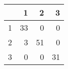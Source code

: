 \begin{tabular}{rrrr}
  \hline
 & 1 & 2 & 3 \\ 
  \hline
1 &  33 &   0 &   0 \\ 
  2 &   3 &  51 &   0 \\ 
  3 &   0 &   0 &  31 \\ 
   \hline
\end{tabular}
